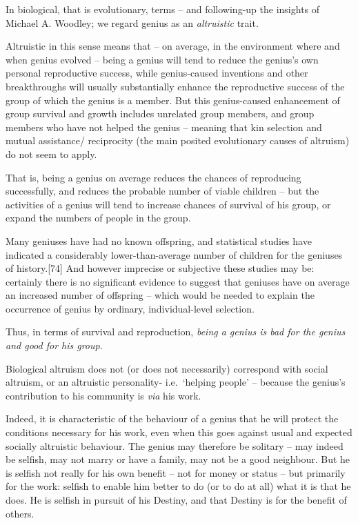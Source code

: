 \documentclass[
]{book}
\begin{document}
In biological, that is evolutionary, terms -- and following-up the insights of Michael A. Woodley; we regard genius as an \emph{altruistic} trait.

Altruistic in this sense means that -- on average, in the environment where and when genius evolved -- being a genius will tend to reduce the genius's own personal reproductive success, while genius-caused inventions and other breakthroughs will usually substantially enhance the reproductive success of the group of which the genius is a member. But this genius-caused enhancement of group survival and growth includes unrelated group members, and group members who have not helped the genius -- meaning that kin selection and mutual assistance/ reciprocity (the main posited evolutionary causes of altruism) do not seem to apply.

That is, being a genius on average reduces the chances of reproducing successfully, and reduces the probable number of viable children -- but the activities of a genius will tend to increase chances of survival of his group, or expand the numbers of people in the group.

Many geniuses have had no known offspring, and statistical studies have indicated a considerably lower-than-average number of children for the geniuses of history.{[}74{]} And however imprecise or subjective these studies may be: certainly there is no significant evidence to suggest that geniuses have on average an increased number of offspring -- which would be needed to explain the occurrence of genius by ordinary, individual-level selection.

Thus, in terms of survival and reproduction, \emph{being a genius is bad for the genius and good for his group}.

Biological altruism does not (or does not necessarily) correspond with social altruism, or an altruistic personality- i.e.~`helping people' -- because the genius's contribution to his community is \emph{via} his work.

Indeed, it is characteristic of the behaviour of a genius that he will protect the conditions necessary for his work, even when this goes against usual and expected socially altruistic behaviour. The genius may therefore be solitary -- may indeed be selfish, may not marry or have a family, may not be a good neighbour. But he is selfish not really for his own benefit -- not for money or status -- but primarily for the work: selfish to enable him better to do (or to do at all) what it is that he does. He is selfish in pursuit of his Destiny, and that Destiny is for the benefit of others.
\end{document}
